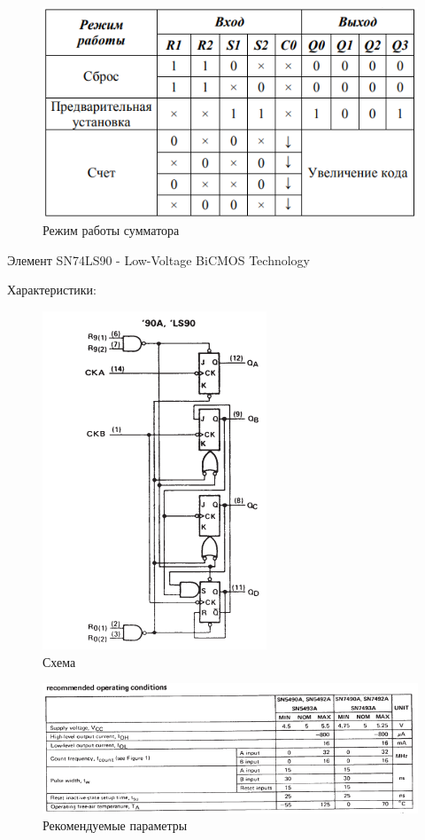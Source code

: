 \begin{figure}[H]
	\centering
	\includegraphics[width=0.85\linewidth]{imgs/13/13_tab}
	\caption{Режим работы сумматора}
	\label{fig:13_tab}
\end{figure}

Элемент SN74LS90 - Low-Voltage BiCMOS Technology

Характеристики:

\begin{figure}[H]
	\centering
	\includegraphics[width=0.55\linewidth]{imgs/13/13_sh}
	\caption{Схема}
	\label{fig:13_sh}
\end{figure}

\begin{figure}[H]
	\centering
	\includegraphics[width=0.95\linewidth]{imgs/13/13_rec}
	\caption{Рекомендуемые параметры}
	\label{fig:13_rec}
\end{figure}

